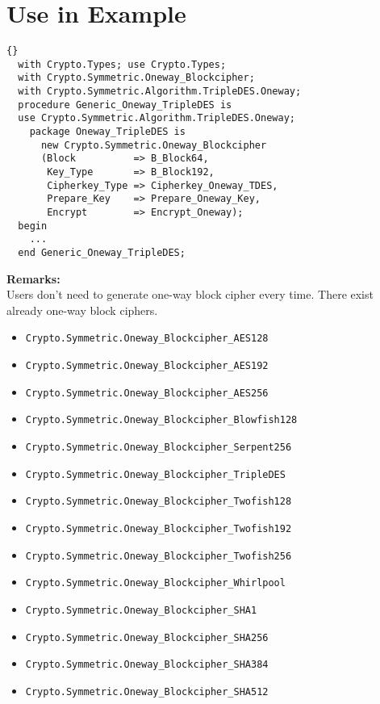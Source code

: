 \section{Use in Example}
\begin{lstlisting}{}
  with Crypto.Types; use Crypto.Types;
  with Crypto.Symmetric.Oneway_Blockcipher;
  with Crypto.Symmetric.Algorithm.TripleDES.Oneway;
  procedure Generic_Oneway_TripleDES is
  use Crypto.Symmetric.Algorithm.TripleDES.Oneway;
    package Oneway_TripleDES is
      new Crypto.Symmetric.Oneway_Blockcipher
      (Block          => B_Block64,
       Key_Type       => B_Block192,
       Cipherkey_Type => Cipherkey_Oneway_TDES,
       Prepare_Key    => Prepare_Oneway_Key,
       Encrypt        => Encrypt_Oneway);
  begin
    ...
  end Generic_Oneway_TripleDES;
\end{lstlisting}
\textbf{Remarks:}\\
Users don't need to generate one-way block cipher every time. There exist already one-way block ciphers.
\begin{itemize}
\item \texttt{Crypto.Symmetric.Oneway\_Blockcipher\_AES128}
\item \texttt{Crypto.Symmetric.Oneway\_Blockcipher\_AES192}
\item \texttt{Crypto.Symmetric.Oneway\_Blockcipher\_AES256}
\item \texttt{Crypto.Symmetric.Oneway\_Blockcipher\_Blowfish128}
\item \texttt{Crypto.Symmetric.Oneway\_Blockcipher\_Serpent256}
\item \texttt{Crypto.Symmetric.Oneway\_Blockcipher\_TripleDES}
\item \texttt{Crypto.Symmetric.Oneway\_Blockcipher\_Twofish128}
\item \texttt{Crypto.Symmetric.Oneway\_Blockcipher\_Twofish192}
\item \texttt{Crypto.Symmetric.Oneway\_Blockcipher\_Twofish256}
\item \texttt{Crypto.Symmetric.Oneway\_Blockcipher\_Whirlpool}
\item \texttt{Crypto.Symmetric.Oneway\_Blockcipher\_SHA1}
\item \texttt{Crypto.Symmetric.Oneway\_Blockcipher\_SHA256}
\item \texttt{Crypto.Symmetric.Oneway\_Blockcipher\_SHA384}
\item \texttt{Crypto.Symmetric.Oneway\_Blockcipher\_SHA512}
\end{itemize}
